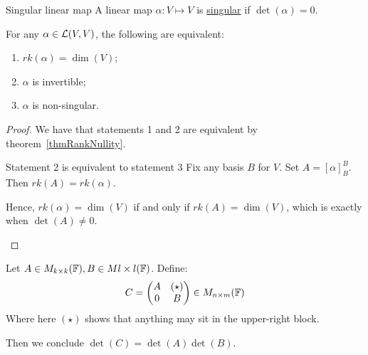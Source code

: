 \documentclass[../Main.tex]{subfiles}
\begin{document}
\begin{definition}{Singular linear map}
    A linear map $\alpha : V \mapsto V$ is \underline{singular} if $\det(\alpha) = 0$.
\end{definition}
\begin{corollary}
    For any $\alpha \in \mathcal{L}(V, V)$, the following are equivalent:
    \begin{enumerate}
        \item $rk(\alpha) = \dim(V)$;
        \item $\alpha$ is invertible;
        \item $\alpha$ is non-singular.
    \end{enumerate}
    \label{corInvertabilityLM}
\end{corollary}
\begin{proof}
    We have that statements 1 and 2 are equivalent by theorem~\ref{thmRankNullity}.
    \begin{subproof}{Statement 2 is equivalent to statement 3}
        Fix any basis $B$ for $V$. Set $A = [\alpha]_B^B$. Then $rk(A) = rk(\alpha)$.
        
        Hence, $rk(\alpha) = \dim(V)$ if and only if $rk(A) = \dim(V)$, which is exactly when $\det(A) \neq 0$.
    \end{subproof}
\end{proof}
\begin{proposition}
    Let $A \in M_{k \times k}(\mathbb{F}), B \in M{l \times l}(\mathbb{F})$. Define:
    \begin{equation*}
        C =
        \begin{pmatrix}
            A & (\star) \\
            0 & B
        \end{pmatrix}
        \in M_{n \times m}(\mathbb{F})
    \end{equation*}
    Where here $(\star)$ shows that anything may sit in the upper-right block.

    Then we conclude $\det(C) = \det(A) \det(B)$.
    \label{propTriangularDet}
\end{proposition}
\end{document}
